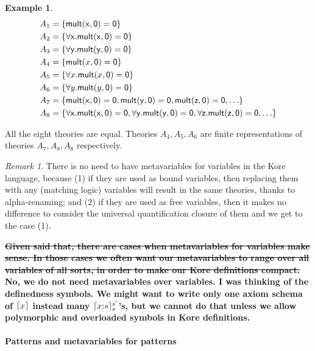 \documentclass[UTF8]{article}
\newcommand{\comment}[1]
    {\par {\bfseries \color{blue} #1 \par}} %
\newcounter{thmcounter}
\theoremstyle{plain}
\theoremstyle{definition}
\newtheorem{example}[thmcounter]{Example}
\theoremstyle{remark}
\newtheorem{remark}[thmcounter]{Remark}
\newcommand{\cln}{{:}}
\DeclarePairedDelimiter{\ceil}{\lceil}{\rceil}
\begin{document}
\begin{example}
  \begin{align*}
  A_1 &= \{{\sf mult(x, 0) = 0}\} \\
  A_2 &= \{{\sf \forall x . mult(x, 0) = 0}\} \\
  A_3 &= \{{\sf \forall y . mult(y, 0) = 0}\} \\
  A_4 &= \{\mathsf{mult}(x, \mathsf{0}) = \mathsf{0}\} \\
  A_5 &= \{\forall x . \mathsf{mult}(x, \mathsf{0}) = \mathsf{0}\} \\
  A_6 &= \{\forall y . \mathsf{mult}(y, \mathsf{0}) = \mathsf{0}\} \\
  A_7 &= \{{\sf mult(x, 0) = 0, mult(y, 0) = 0, mult(z, 0) = 0, \dots}\} \\
  A_8 &= \{{\sf \forall x . mult(x, 0) = 0, \forall y . mult(y, 0) = 0, \forall z . mult(z, 0) = 0, \dots}\}
  \end{align*}
  
  All the eight theories are equal. Theories $A_4, A_5, A_6$ are finite representations of theories $A_7, A_8, A_8$ respectively. 
\end{example}

\begin{remark}
\label{no_need_to_have_metavariables_for_variables}
There is no need to have metavariables for variables in the Kore language, because (1) if they are used as bound variables, then replacing them with any (matching logic) variables will result in the same theories, thanks to alpha-renaming; and (2) if they are used as free variables, then it makes no difference to consider the universal quantification closure of them and we get to the case (1). 
\comment{\sout{Given said that, there are cases when metavariables for variables make sense. In those cases we often want our metavariables to range over all variables of all sorts, in order to make our Kore definitions compact.} No, we do not need metavariables over variables. I was thinking of the definedness symbols. We might want to write only one axiom schema of $\ceil{x}$ instead many $\ceil{x \cln s}_s^{s'}$'s, but we cannot do that unless we allow polymorphic and overloaded symbols in Kore definitions.}
\end{remark}


\paragraph{Patterns and metavariables for patterns}
\end{document}
